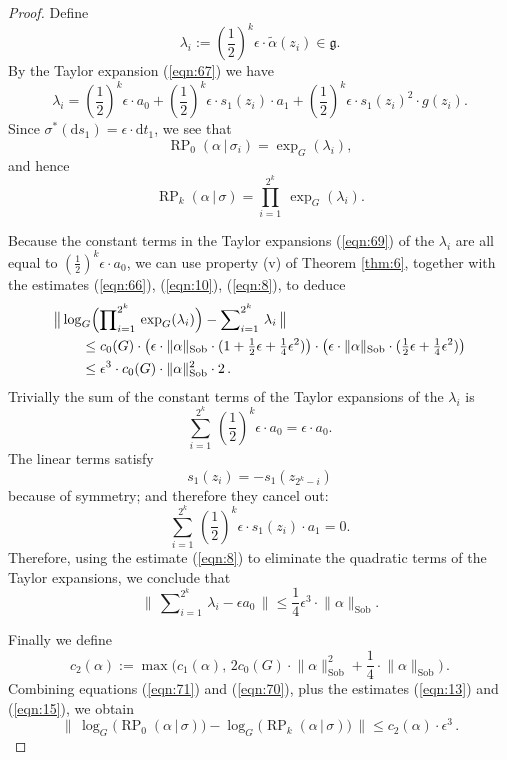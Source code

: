 \documentclass[10pt, a4paper]{amsart}
\theoremstyle{definition}
\numberwithin{equation}{section}
\newcommand{\opn}{\operatorname}
\newcommand{\mfrak}[1]{\mathfrak{#1}}
\newcommand{\mrm}[1]{\mathrm{#1}}
\newcommand{\smfrac}[2]{{\textstyle \frac{#1}{#2}}}
\newcommand{\bosum}{\sum\nolimits}
\newcommand{\boprod}{\prod\nolimits}
\newcommand{\til}[1]{\tilde{#1}}
\newcommand{\norm}[1]{\lVert #1 \rVert}
\newcommand{\Norm}[1]{\bigl\lVert\, #1 \, \bigr\rVert}
\renewcommand{\vert}{\, | \,}
\newcommand{\g}{\mfrak{g}}
\renewcommand{\d}{\mrm{d}}
\begin{document}
\begin{proof}
Define
\[ \lambda_i := (\smfrac{1}{2})^k \epsilon \cdot \til{\alpha}(z_i) \in \g . \]
By the Taylor expansion (\ref{eqn:67}) we have
\begin{equation} \label{eqn:69}
\lambda_i =  (\smfrac{1}{2})^k \epsilon \cdot a_0 + 
(\smfrac{1}{2})^k \epsilon \cdot s_1(z_i) \cdot a_1 + 
(\smfrac{1}{2})^k \epsilon \cdot s_1(z_i)^2 \cdot g(z_i)  .
\end{equation}
Since $\sigma^*(\d s_1) = \epsilon \cdot \d t_1$, we see that 
\[ \opn{RP}_{0}(\alpha \vert \sigma_i) = 
\opn{exp}_G(\lambda_i) , \]
and hence 
\begin{equation} \label{eqn:70}
\opn{RP}_{k}(\alpha \vert \sigma) = 
\prod_{i = 1}^{2^k} \ 
\opn{exp}_G (\lambda_i) . 
\end{equation}

Because the constant terms in the Taylor expansions (\ref{eqn:69}) of the
$\lambda_i$ are all equal to 
$(\smfrac{1}{2})^k \epsilon \cdot  a_0$, 
we can use property (v) of Theorem \ref{thm:6}, together with the estimates 
(\ref{eqn:66}), (\ref{eqn:10}), (\ref{eqn:8}), to deduce
\begin{equation}  \label{eqn:15}
\begin{aligned}
& \Norm{ \log_G \Bigl( \boprod_{i = 1}^{2^k}  \, \exp_G (\lambda_i) \Bigr)
 - \bosum_{i = 1}^{2^k} \, \lambda_i } \\
& \qquad \leq c_0(G) \cdot \bigl( 
\epsilon \cdot \norm{\alpha}_{\mrm{Sob}} \cdot 
(1 + \smfrac{1}{2} \epsilon + \smfrac{1}{4} \epsilon^2 ) \bigr)
\cdot \bigl( \epsilon \cdot \norm{\alpha}_{\mrm{Sob}} \cdot 
(\smfrac{1}{2} \epsilon + \smfrac{1}{4} \epsilon^2 ) \bigr) \\
& \qquad \leq \epsilon^3 \cdot c_0(G) \cdot 
\norm{\alpha}_{\mrm{Sob}}^2 \cdot 2 \, . 
\end{aligned} 
\end{equation}
Trivially the sum of the constant terms of the Taylor expansions of the
$\lambda_i$ is
\[ \sum_{i=1}^{2^k}\,  (\smfrac{1}{2})^k \epsilon \cdot a_0 = 
\epsilon \cdot a_0 . \]
The linear terms satisfy
\[ s_1(z_i) = - s_1(z_{2^{k} - i}) \]
because of symmetry; and therefore they cancel out:
\[ \sum_{i=1}^{2^k}\,  (\smfrac{1}{2})^k \epsilon \cdot
s_1(z_i) \cdot a_1 = 0 . \]
Therefore, using the estimate (\ref{eqn:8}) to eliminate the quadratic terms of
the Taylor expansions, we conclude that
\begin{equation} \label{eqn:13}
\Norm{ \bosum_{i = 1}^{2^k} \,  \lambda_i - \epsilon a_0 } \leq 
\smfrac{1}{4} \epsilon^3  \cdot \norm{\alpha}_{\mrm{Sob}} . 
\end{equation}

Finally we define
\[ c_2(\alpha) := \max \bigl( c_1(\alpha), \, 
2 c_0(G) \cdot \norm{\alpha}_{\mrm{Sob}}^2 + 
\smfrac{1}{4} \cdot \norm{\alpha}_{\mrm{Sob}} \bigr) \, . \]
Combining equations (\ref{eqn:71}) and (\ref{eqn:70}), plus the estimates
(\ref{eqn:13}) and (\ref{eqn:15}), we obtain 
\[ \Norm{ \log_G \bigl( \opn{RP}_0 (\alpha \vert \sigma) \bigl) - 
\log_G \bigl( \opn{RP}_{k} (\alpha \vert \sigma) \bigl) } 
\leq c_2(\alpha) \cdot \epsilon^3  \, . \]
\end{proof}
\end{document}
